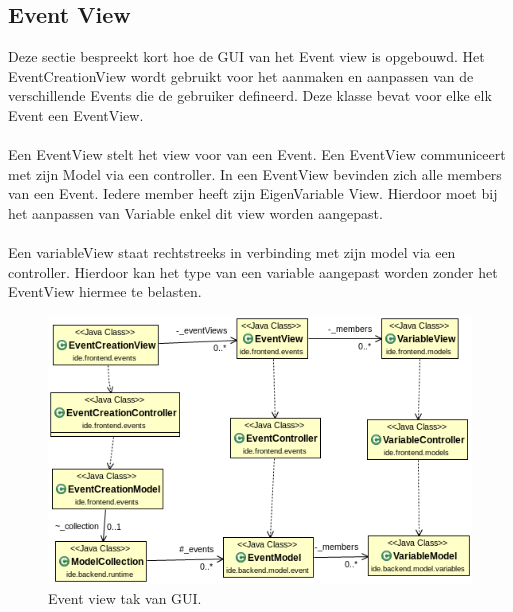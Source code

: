 \documentclass[]{article}
\begin{document}
\subsection{Event View}
Deze sectie bespreekt kort hoe de GUI van het Event view is opgebouwd. Het EventCreationView wordt gebruikt voor het aanmaken en aanpassen van de verschillende Events die de gebruiker defineerd. Deze klasse bevat voor elke elk Event een EventView.\\\\
Een EventView stelt het view voor van een Event. Een EventView communiceert met zijn Model via een controller. In een EventView bevinden zich alle members van een Event. Iedere member heeft zijn EigenVariable View. Hierdoor moet bij het aanpassen van Variable enkel dit view worden aangepast.\\\\
Een variableView staat rechtstreeks in verbinding met zijn model via een controller. Hierdoor kan het type van een variable aangepast worden zonder het EventView hiermee te belasten.
\begin{figure}[H]
  \centering 
\includegraphics[scale=0.4]{AnalyseADTAlgorithm/viewsmvc/EventTak}
  \caption{Event view tak van GUI.} \label{EventViews}
\end{figure}
\end{document}
